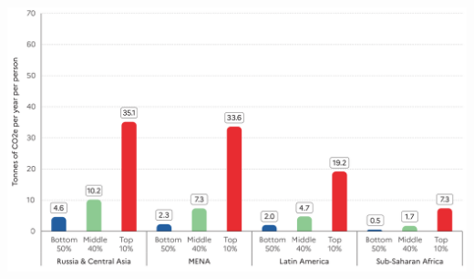 \documentclass[9pt,handout,aspectratio=169]{beamer}
\begin{document}
\begin{frame}
\begin{scriptsize}
\begin{columns}
      \begin{center}
        \includegraphics[width=1.0\textwidth]{plots/WIR_carbon_per_capita_rest.png}
      \end{center}      
    \end{columns}

  \end{scriptsize}
  \end{frame}




\end{document}
